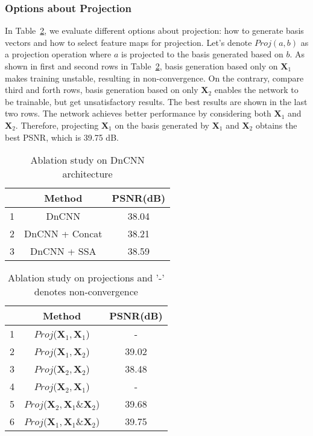 \documentclass[final]{cvpr}
\newcommand{\bs}{\boldsymbol}
\newcommand{\Xa}{\bs{X}_{1}}
\newcommand{\Xb}{\bs{X}_{2}}
\begin{document}
\subsubsection{Options about Projection}


In Table~\ref{tab:abl study proj}, we evaluate different options about projection: how to generate basis vectors and how to select feature maps for projection. Let's denote $Proj(a,b)$ as a projection operation where $a$ is projected to the basis generated based on $b$. As shown in first and second rows in Table~\ref{tab:abl study proj}, basis generation based  only on $\Xa$ makes training unstable, resulting in non-convergence. On the contrary, compare third and forth rows, basis generation based on only $\Xb$ enables the network to be trainable, but get unsatisfactory results. The best results are shown in the last two rows. The network achieves better performance by considering both $\Xa$ and $\Xb$. Therefore, projecting $\Xa$ on the basis generated by $\Xa$ and $\Xb$ obtains the best PSNR, which is 39.75 dB.
\begin{table}[t]
    \centering
    \begin{tabular}{ccc}
    \toprule
     & Method  & PSNR(dB)\\
    \midrule
    1 & DnCNN & 38.04 \\
2 & DnCNN + Concat & 38.21\\
    3 & DnCNN + SSA & 38.59 \\
    \bottomrule
    \end{tabular}
    \caption{Ablation study on DnCNN architecture}
    \label{tab:abl dncnn}
\end{table} \begin{table}[t]
    \centering
    \begin{tabular}{ccc}
    \toprule
     & Method  & PSNR(dB) \\
    \midrule
    1 & $Proj$($\Xa, \Xa$) & - \\
2 & $Proj$($\Xa, \Xb$) & 39.02\\
3 & $Proj$($\Xb, \Xb$) & 38.48\\
    4 & $Proj$($\Xb, \Xa$) & - \\
    5 & $Proj$($\Xb, \Xa \& \Xb$) & 39.68 \\
    6 & $Proj$($\Xa, \Xa \& \Xb$) & 39.75 \\
    \bottomrule
    \end{tabular}
    \caption{Ablation study on projections and '-' denotes non-convergence}
    \label{tab:abl study proj}
\end{table} 
\end{document}
